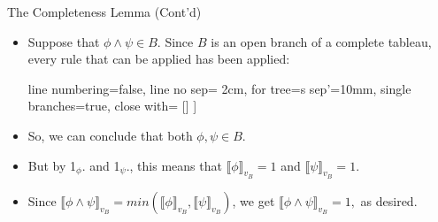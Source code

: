 \documentclass[../slides.tex]{subfiles}
\begin{document}
\begin{frame}{The Completeness Lemma (Cont'd)}

	\begin{itemize}
		
			\item Suppose that $\phi\land \psi\in B$. Since $B$ is an open branch of a complete tableau, every rule that can be applied has been applied:
			\begin{center}
				\begin{prooftree}
					{
					line numbering=false,
					line no sep= 2cm,
					for tree={s sep'=10mm},
					single branches=true,
					close with=\xmark
					}
					[\phi\land\psi [\phi [\psi ] ] ]
					\end{prooftree}
				\end{center}
		\item So, we can conclude that both $\phi,\psi\in B$. 
		
		\item But by 1$_\phi$. and 1$_\psi$., this means that $\llbracket\phi\rrbracket_{v_B}=1$ and $\llbracket\psi\rrbracket_{v_B}=1$. 
		
		\item Since $\llbracket\phi\land \psi\rrbracket_{v_B}=min(\llbracket\phi\rrbracket_{v_B},\llbracket\psi\rrbracket_{v_B})$, we get $\llbracket\phi\land \psi\rrbracket_{v_B}=1,$ as desired.
		
	\end{itemize}
		

\end{frame}
\end{document}
